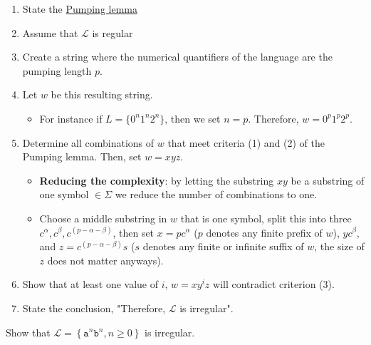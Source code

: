 \begin{enumerate}
    \item State the \hyperref[pumping_lemma_defn]{Pumping lemma}
    \item Assume that $\mathcal{L}$ is regular
    \item Create a string where the numerical quantifiers of the language are the pumping length $p$.
    \item Let $w$ be this resulting string. 
    \begin{itemize}
        \item For instance if $L=\{0^n1^n2^n\}$, then we set $n=p$. Therefore, $w= 0^p1^p2^p$.
    \end{itemize}
    \item Determine all combinations of $w$ that meet criteria (1) and (2) of the Pumping lemma. Then, set $w=xyz$.
    \begin{itemize}
        \item \textbf{Reducing the complexity}: by letting the substring $xy$ be a substring of one symbol $\in \Sigma$ we reduce the number of combinations to one.
        \item Choose a middle substring in $w$ that is one symbol, split this into three $c^\alpha, c^\beta, c^{(p-\alpha-\beta)}$, then set $x=pc^\alpha$ ($p$ denotes any finite prefix of $w$), $yc^\beta$, and $z=c^{(p-\alpha-\beta)}s$ ($s$ denotes any finite or infinite suffix of $w$, the size of $z$ does not matter anyways).
    \end{itemize}
    \item Show that at least one value of $i$, $w=xy^iz$ will contradict criterion (3). 
    \item State the conclusion, "Therefore, $\mathcal{L}$ is irregular".
\end{enumerate}

\begin{ex}
    Show that $\mathcal{L} = \left\{\texttt{a$^n$b$^n$}, n\geq0\right\}$ is irregular.
\end{ex}

